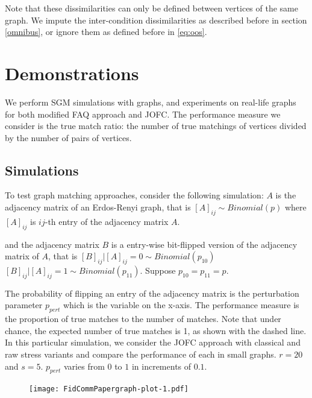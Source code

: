 \documentclass[12pt,oneside,final]{thesis}\usepackage[]{graphicx}\usepackage[]{color}
\begin{document}
 Note that these dissimilarities can only be defined between vertices of the same graph. We impute the inter-condition dissimilarities   as described before in section \ref{omnibus}, or ignore them as defined before in \ref{eq:oos}.
 
\section{Demonstrations}

We perform SGM simulations with graphs, and experiments on real-life graphs for  both modified FAQ approach and JOFC. The performance measure we consider is the true match ratio: the number of true matchings of vertices  divided by the number of pairs of vertices.

\subsection{Simulations}
  To test graph matching approaches, consider the following simulation: $A$ is the adjacency matrix of an Erdos-Renyi graph, that is
  $\left[A\right]_{ij} \sim Binomial(p)$ where $\left[A\right]_{ij}$ is $ij$-th entry of the adjacency matrix  $A$.
 
   and the adjacency matrix  $B$ is a entry-wise bit-flipped version of the adjacency matrix of $A$, that is
   $\left[B\right]_{ij}|\left[A\right]_{ij}=0 \sim Binomial(p_{10})$ $\left[B\right]_{ij}|\left[A\right]_{ij}=1 \sim Binomial(p_{11})$. Suppose $p_{10}=p_{11}=p$.
  
  The probability of flipping an entry of the adjacency matrix is the perturbation parameter $p_{pert}$ which is the variable on the x-axis. 
  The performance measure is the proportion of true matches to the number of matches. Note that 
  under chance, the expected number of true matches is 1, as shown with the dashed line. In this particular simulation, we consider the JOFC approach with classical and raw stress variants and compare the performance of each in small graphs. $r=20$ and $s=5$. $p_{pert}$ varies from $0$ to $1$ in increments of $0.1$.  
  
\begin{figure}
  \texttt{[image: FidCommPapergraph-plot-1.pdf]}
\end{figure}
\end{document}
